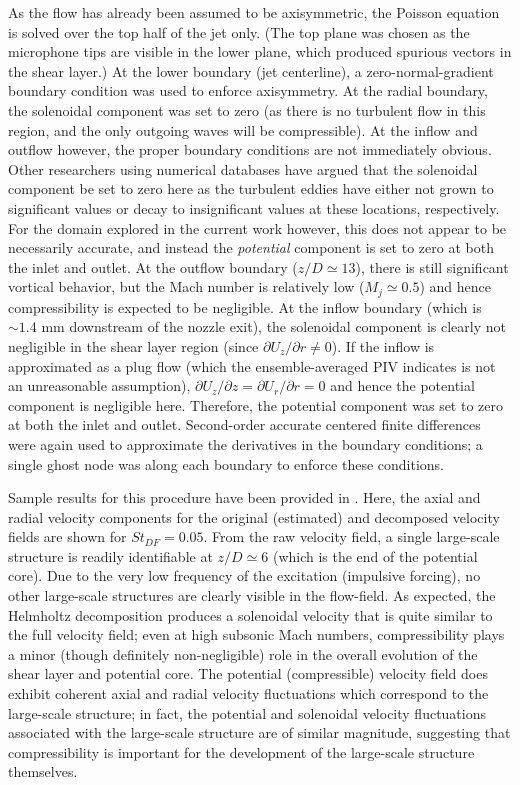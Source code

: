 As the flow has already been assumed to be axisymmetric, the Poisson equation is solved over the top half of the jet only.
(The top plane was chosen as the microphone tips are visible in the lower plane, which produced spurious vectors in the shear layer.)
At the lower boundary (jet centerline), a zero-normal-gradient boundary condition was used to enforce axisymmetry.
At the radial boundary, the solenoidal component was set to zero (as there is no turbulent flow in this region, and the only outgoing waves will be compressible).
At the inflow and outflow however, the proper boundary conditions are not immediately obvious.
Other researchers using numerical databases \citep{Unnikrishnan2015} have argued that the solenoidal component be set to zero here as the turbulent eddies have either not grown to significant values or decay to insignificant values at these locations, respectively.
For the domain explored in the current work however, this does not appear to be necessarily accurate, and instead the \textit{potential} component is set to zero at both the inlet and outlet.
At the outflow boundary ($z/D \simeq 13$), there is still significant vortical behavior, but the Mach number is relatively low ($M_j \simeq 0.5$) and hence compressibility is expected to be negligible.
At the inflow boundary (which is $\sim1.4$ mm downstream of the nozzle exit), the solenoidal component is clearly not negligible in the shear layer region (since $\partial U_z / \partial r \neq 0$).
If the inflow is approximated as a plug flow (which the ensemble-averaged PIV indicates is not an unreasonable assumption), $\partial U_z / \partial z = \partial U_r / \partial r = 0$ and hence the potential component is negligible here.
Therefore, the potential component was set to zero at both the inlet and outlet.
Second-order accurate centered finite differences were again used to approximate the derivatives in the boundary conditions; a single ghost node was along each boundary to enforce these conditions.

Sample results for this procedure have been provided in .
Here, the axial and radial velocity components for the original (estimated) and decomposed velocity fields are shown for $St_{DF}=0.05$.
From the raw velocity field, a single large-scale structure is readily identifiable at $z/D \simeq 6$ (which is the end of the potential core).
Due to the very low frequency of the excitation (impulsive forcing), no other large-scale structures are clearly visible in the flow-field.
As expected, the Helmholtz decomposition produces a solenoidal velocity that is quite similar to the full velocity field; even at high subsonic Mach numbers, compressibility plays a minor (though definitely non-negligible) role in the overall evolution of the shear layer and potential core.
The potential (compressible) velocity field does exhibit coherent axial and radial velocity fluctuations which correspond to the large-scale structure; in fact, the potential and solenoidal velocity fluctuations associated with the large-scale structure are of similar magnitude, suggesting that compressibility is important for the development of the large-scale structure themselves.

